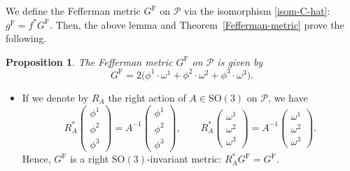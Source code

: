 \documentclass[pdftex]{sigma}
\numberwithin{equation}{section}
\newtheorem{Proposition}[Theorem]{Proposition}
 { \theoremstyle{definition}
\newtheorem{Definition}[Theorem]{Definition}
\newtheorem*{Notation}{Notation}
\newtheorem{Example}[Theorem]{Example}
\newtheorem{Remark}[Theorem]{Remark} }
\begin{document}
We define the Fefferman metric $G^{\mathrm{F}}$ on $\mathcal{P}$ via the isomorphism \eqref{isom-C-hat}: $g^{\mathrm{F}}=f^* G^{\mathrm{F}}$. Then, the above lemma and Theorem~\ref{Fefferman-metric} prove the following.

\begin{Proposition}
The Fefferman metric $G^{\mathrm{F}}$ on $\mathcal{P}$ is given by
\[
G^{\mathrm{F}}=2\bigl( \phi^1\cdot\omega^1+ \phi^2\cdot\omega^2+ \phi^3\cdot\omega^3\bigr).
\]
\end{Proposition}

\begin{Remark}\quad
\begin{itemize}\itemsep=0pt
\item[(i)]
If we denote by $R_A$ the right action of $A\in\mathrm{SO}(3)$ on $\mathcal{P}$, we have
\[
R_A^*\begin{pmatrix}
\phi^1 \\ \phi^2 \\ \phi^3
\end{pmatrix}=A^{-1}\begin{pmatrix}
\phi^1 \\ \phi^2 \\ \phi^3
\end{pmatrix}, \qquad R_A^*\begin{pmatrix}
\omega^1 \\ \omega^2 \\ \omega^3
\end{pmatrix}=A^{-1}\begin{pmatrix}
\omega^1 \\ \omega^2 \\ \omega^3
\end{pmatrix}.
\]
Hence, $G^{\mathrm{F}}$ is a right $\mathrm{SO}(3)$-invariant metric: $R_A^*G^{\mathrm{F}}=G^{\mathrm{F}}$.


\end{itemize}
\end{Remark}
\end{document}
